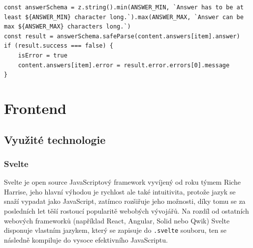 \documentclass[12pt, a4paper,
openright
]{report}
\begin{document}
\begin{lstlisting}[style=ES6, caption=Validace vstupu pomocí validační knihovny Zod, label=zod]
const answerSchema = z.string().min(ANSWER_MIN, `Answer has to be at least ${ANSWER_MIN} character long.`).max(ANSWER_MAX, `Answer can be max ${ANSWER_MAX} characters long.`)
const result = answerSchema.safeParse(content.answers[item].answer)
if (result.success === false) {
	isError = true
	content.answers[item].error = result.error.errors[0].message
}
\end{lstlisting}


\chapter{Frontend}

\section{Využité technologie}
\subsection{Svelte}
Svelte je open source JavaScriptový framework vyvíjený od roku týmem Riche Harrise, jeho hlavní výhodou je rychlost ale také intuitivita, protože jazyk se snaží vypadat jako JavaScript, zatímco rozšiřuje jeho možnosti, díky tomu se za posledních let těší rostoucí popularitě webobých vývojářů. Na rozdíl od ostatních webových frameworků (například React, Angular, Solid nebo Qwik) Svelte disponuje vlastním jazykem, který se zapisuje do \texttt{.svelte} souboru, ten se následně kompiluje do vysoce efektivního JavaScriptu.
\end{document}
